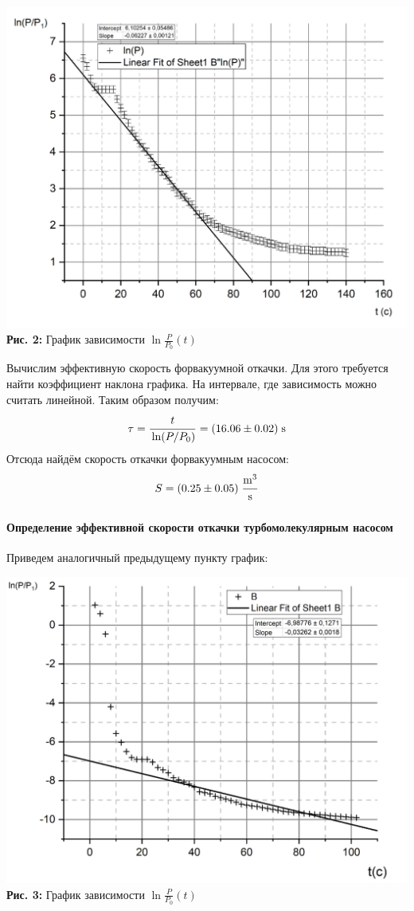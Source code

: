 \documentclass[12pt,a4paper]{scrartcl}
\begin{document}
	\begin{center}
		\includegraphics[scale = 0.4]{PIC_2.png}
		\\\textbf{Рис. 2:} График зависимости $\ln \frac{P}{P_0}(t)$
	\end{center}
	
	Вычислим эффективную скорость форвакуумной откачки. Для этого требуется найти коэффициент наклона графика. На интервале, где зависимость можно считать линейной. Таким образом получим:
	$$ \tau = \dfrac{\strut t}{\strut \ln(P / P_0)} = (16.06 \pm 0.02 ) \; \mathrm{s} $$
	Отсюда найдём скорость откачки форвакуумным насосом:
	$$ S = (0.25 \pm 0.05) \; \dfrac{\strut \mathrm{m}^3 }{\strut \mathrm{s}}$$
	
	
	\paragraph{Определение эффективной скорости откачки турбомолекулярным насосом} \hfill
	
	Приведем аналогичный предыдущему пункту график:
	
	\begin{center}
		\includegraphics[scale=0.2]{PIC_3.png}
		\\\textbf{Рис. 3:} График зависимости $\ln \frac{P}{P_0}(t)$
	\end{center}
	
\end{document}
